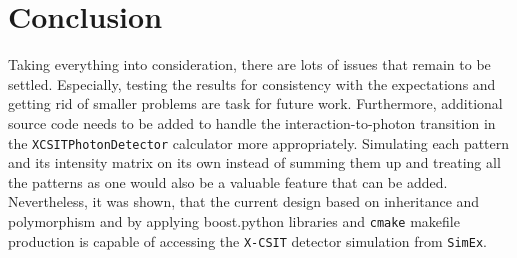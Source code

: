 \section{Conclusion}
Taking everything into consideration, there are lots of issues that remain to be settled. Especially, testing the results for consistency with the expectations and getting rid of smaller problems are task for future work. Furthermore, additional source code needs to be added to handle the interaction-to-photon transition in the \texttt{XCSITPhotonDetector} calculator more appropriately. Simulating each pattern and its intensity matrix on its own instead of summing them up and treating all the patterns as one would also be a valuable feature that can be added. Nevertheless, it was shown, that the current design based on inheritance and polymorphism and by applying boost.python libraries and \texttt{cmake} makefile production is capable of accessing the \texttt{X-CSIT} detector simulation from \texttt{SimEx}. 